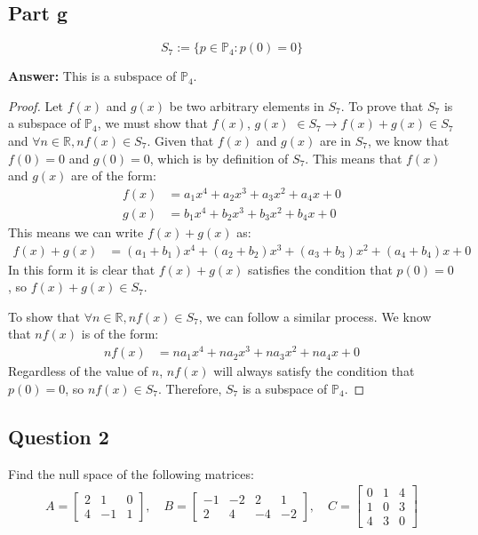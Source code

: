 \documentclass{article}
\begin{document}
\subsection*{Part g}
\[ S_{7} := \{p \in \mathbb{P}_{4} : p(0) = 0\} \]

\textbf{Answer:} This is a subspace of $\mathbb{P}_{4}$.

\begin{proof}
Let $f(x)$ and $g(x)$ be two arbitrary elements in $S_{7}$.
To prove that $S_{7}$ is a subspace of $\mathbb{P}_{4}$, we must show that $f(x)$, $g(x)$ $\in S_{7} \rightarrow f(x) + g(x) \in S_{7}$ and $\forall n \in \mathbb{R}, nf(x) \in S_{7}$.
Given that $f(x)$ and $g(x)$ are in $S_{7}$, we know that $f(0) = 0$ and $g(0) = 0$, which is by definition of $S_{7}$.
This means that $f(x)$ and $g(x)$ are of the form:
\begin{align*} 
    f(x) &= a_{1}x^4 + a_{2}x^3 + a_{3}x^2 + a_{4}x + 0 \\ 
    g(x) &= b_{1}x^4 + b_{2}x^3 + b_{3}x^2 + b_{4}x + 0
\end{align*}
This means we can write $f(x) + g(x)$ as:
\begin{align*} 
    f(x) + g(x) &= (a_{1} + b_{1})x^4 + (a_{2} + b_{2})x^3 + (a_{3} + b_{3})x^2 + (a_{4} + b_{4})x + 0
\end{align*}
In this form it is clear that $f(x) +g(x)$ satisfies the condition that $p(0) = 0$, so $f(x) + g(x) \in S_{7}$.

To show that $\forall n \in \mathbb{R}, nf(x) \in S_{7}$, we can follow a similar process.
We know that $nf(x)$ is of the form:
\begin{align*} 
    nf(x) &= na_{1}x^4 + na_{2}x^3 + na_{3}x^2 + na_{4}x + 0
\end{align*}
Regardless of the value of $n$, $nf(x)$ will always satisfy the condition that $p(0) = 0$, so $nf(x) \in S_{7}$.
Therefore, $S_{7}$ is a subspace of $\mathbb{P}_{4}$.
\end{proof}

\subsection*{Question 2}
Find the null space of the following matrices:
\begin{align*}
A = \begin{bmatrix} 2 & 1 & 0 \\ 4 & -1 & 1 \end{bmatrix}, \quad
B = \begin{bmatrix} -1 & -2 & 2 & 1 \\ 2 & 4 & -4 & -2 \end{bmatrix}, \quad
C = \begin{bmatrix} 0 & 1 & 4 \\ 1 & 0 & 3 \\ 4 & 3 & 0 \end{bmatrix}
\end{align*}
\end{document}
